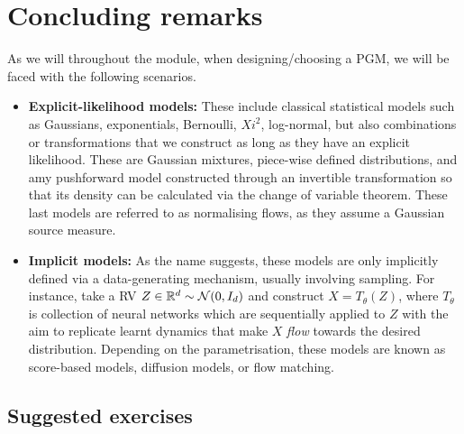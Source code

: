 \section{Concluding remarks}

As we will throughout the module, when designing/choosing a PGM, we will be faced with the following scenarios. 

\begin{itemize}
	\item \textbf{Explicit-likelihood models:} These include classical statistical models such as Gaussians, exponentials, Bernoulli, $Xi^2$, log-normal, but also combinations or transformations that we construct as long as they have an explicit likelihood. These are Gaussian mixtures, piece-wise defined distributions, and amy pushforward model constructed through an invertible transformation so that its density can be calculated via the change of variable theorem. These last models are referred to as normalising flows, as they assume a Gaussian source measure. 
	\item \textbf{Implicit models:} As the name suggests, these models are only implicitly defined via a data-generating mechanism, usually involving sampling. For instance, take a RV $Z\in{\mathbb R}^d\sim{\mathcal N}(0,I_d)$ and construct $X=T_\theta(Z)$, where $T_\theta$ is collection of neural networks which are sequentially applied to $Z$ with the aim to replicate learnt dynamics that make $X$ \emph{flow} towards the desired distribution. Depending on the parametrisation, these models are known as score-based models, diffusion models, or flow matching.   
\end{itemize}

\subsection{Suggested exercises}



